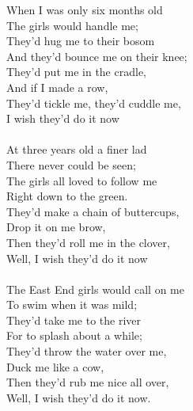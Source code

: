 \documentclass[twoside,13pt,openany,letterpaper]{memoir}%
\begin{document}

When I was only six months old\\
The girls would handle me;\\
They'd hug me to their bosom\\
And they'd bounce me on their knee;\\
They'd put me in the cradle,\\
And if I made a row,\\
They'd tickle me, they'd cuddle me,\\
I wish they'd do it now\\
\\
At three years old a finer lad\\
There never could be seen;\\
The girls all loved to follow me\\
Right down to the green.\\
They'd make a chain of buttercups,\\
Drop it on me brow,\\
Then they'd roll me in the clover,\\
Well, I wish they'd do it now\\
\\
The East End girls would call on me\\
To swim when it was mild;\\
They'd take me to the river\\
For to splash about a while;\\
They'd throw the water over me,\\
Duck me like a cow,\\
Then they'd rub me nice all over,\\
Well, I wish they'd do it now.\\

\end{document}
